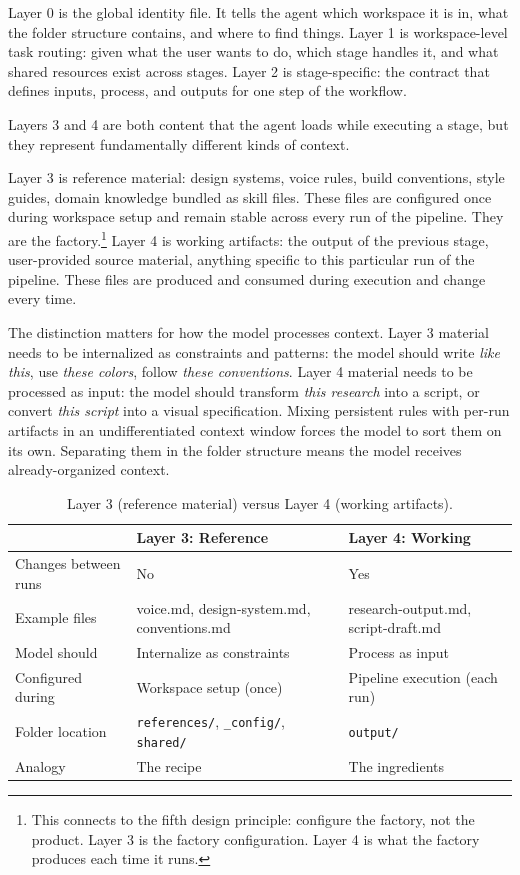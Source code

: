 \documentclass[acmlarge,nonacm,screen]{acmart}
\begin{document}
Layer 0 is the global identity file. It tells the agent which workspace it is in, what the folder structure contains, and where to find things. Layer 1 is workspace-level task routing: given what the user wants to do, which stage handles it, and what shared resources exist across stages. Layer 2 is stage-specific: the contract that defines inputs, process, and outputs for one step of the workflow.

Layers 3 and 4 are both content that the agent loads while executing a stage, but they represent fundamentally different kinds of context.

Layer 3 is reference material: design systems, voice rules, build conventions, style guides, domain knowledge bundled as skill files. These files are configured once during workspace setup and remain stable across every run of the pipeline. They are the factory.\footnote{This connects to the fifth design principle: configure the factory, not the product. Layer 3 is the factory configuration. Layer 4 is what the factory produces each time it runs.} Layer 4 is working artifacts: the output of the previous stage, user-provided source material, anything specific to this particular run of the pipeline. These files are produced and consumed during execution and change every time.

The distinction matters for how the model processes context. Layer 3 material needs to be internalized as constraints and patterns: the model should write \textit{like this}, use \textit{these colors}, follow \textit{these conventions}. Layer 4 material needs to be processed as input: the model should transform \textit{this research} into a script, or convert \textit{this script} into a visual specification. Mixing persistent rules with per-run artifacts in an undifferentiated context window forces the model to sort them on its own. Separating them in the folder structure means the model receives already-organized context.

\begin{table}[t]
\centering
\caption{Layer 3 (reference material) versus Layer 4 (working artifacts).}
\label{tab:layers34}
\begin{tabular}{p{3.5cm} p{4.8cm} p{4.8cm}}
\toprule
& \textbf{Layer 3: Reference} & \textbf{Layer 4: Working} \\
\midrule
Changes between runs & No & Yes \\
\addlinespace
Example files & voice.md, design-system.md, conventions.md & research-output.md, script-draft.md \\
\addlinespace
Model should & Internalize as constraints & Process as input \\
\addlinespace
Configured during & Workspace setup (once) & Pipeline execution (each run) \\
\addlinespace
Folder location & \texttt{references/}, \texttt{\_config/}, \texttt{shared/} & \texttt{output/} \\
\addlinespace
Analogy & The recipe & The ingredients \\
\bottomrule
\end{tabular}
\end{table}
\end{document}
